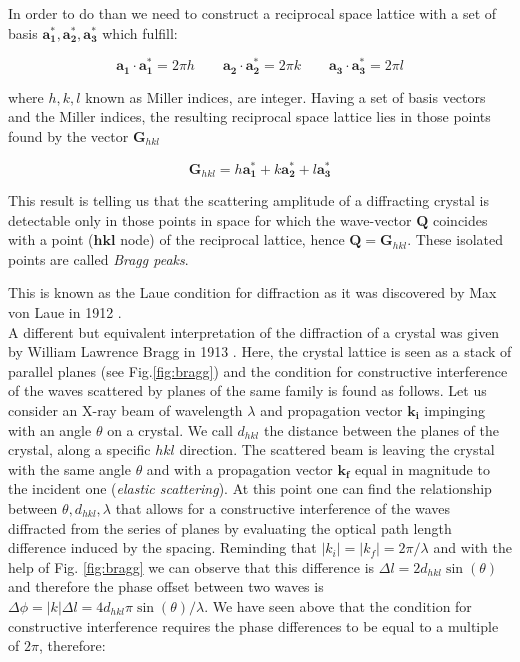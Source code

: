 In order to do than we need to construct a reciprocal space lattice with a set of basis ${\mathbf{a_1^\ast}, \mathbf{a_2^\ast}, \mathbf{a_3^\ast}}$ 
which fulfill: 

\begin{equation}
    \mathbf{a_1} \cdot \mathbf{a_1^\ast} = 2\pi h \qquad \mathbf{a_2} \cdot \mathbf{a_2^\ast} = 2\pi k \qquad \mathbf{a_3} \cdot \mathbf{a_3^\ast} = 2\pi l 
   \label{eq:miller}
\end{equation}

where $ h, k, l $ known as Miller indices, are integer. Having a set of basis vectors and the Miller indices, the 
resulting reciprocal space lattice lies in those points found by the vector $\mathbf{G}_{hkl}$ 

\begin{equation}
    \mathbf{G}_{hkl} =  h\mathbf{a_1^\ast} + k\mathbf{a_2^\ast} + l\mathbf{a_3^\ast} 
   \label{eq:G}
\end{equation}

This result is telling us that the scattering amplitude of a diffracting crystal is detectable only in those points 
in space for which the wave-vector $\mathbf{Q}$ coincides with a point ($\mathbf{hkl}$ node) of the reciprocal lattice, 
hence $\mathbf{Q} = \mathbf{G}_{hkl}$. These isolated points are called \textit{Bragg peaks}.

This is known as the Laue condition for diffraction as it was discovered by Max von Laue in 1912 \cite{FriedrichKnippingLaue1912}.\\ 

A different but equivalent interpretation of the diffraction of a crystal was given by William Lawrence Bragg in 1913 \cite{Bragg1913}. 
Here, the crystal lattice is seen as a stack of parallel planes (see Fig.\ref{fig:bragg}) and the condition for constructive interference of 
the waves scattered by planes of the same family is found as follows.
Let us consider an X-ray beam of wavelength $\lambda$ and propagation vector $\mathbf{k_i} $ impinging with an angle $\theta$ 
on a crystal. We call $d_{hkl}$ the distance between the planes of the crystal, along a specific ${hkl}$ direction. The scattered 
beam is leaving the crystal with the 
same angle $\theta$ and with a propagation vector $\mathbf{k_f}$ equal in magnitude to the incident one (\textit{elastic scattering}). 
At this point one can find the relationship between $ \theta, d_{hkl}, \lambda$ that allows for a constructive interference of the 
waves diffracted from the series of planes by evaluating the optical path length difference induced by the spacing. 
Reminding that $\left|k_i\right| = \left|k_f\right| = 2\pi/\lambda $ and with the help of Fig. \ref{fig:bragg} we can observe that this 
difference is $\Delta l = 2 d_{hkl} \sin(\theta)$ and therefore the phase offset between two waves is $\Delta \phi = \left|k\right| \Delta l 
= 4 d_{hkl}\pi \sin(\theta)/\lambda $. We have seen above that the condition for constructive interference requires the phase 
differences to be equal to a multiple of $2\pi$, therefore: 

